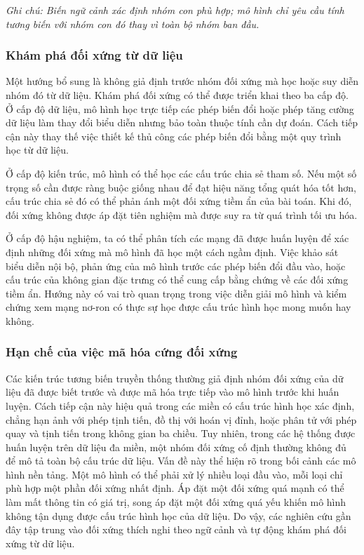 \noindent\textit{Ghi chú: Biến ngữ cảnh xác định nhóm con phù hợp; mô hình chỉ yêu cầu tính tương biến với nhóm con đó thay vì toàn bộ nhóm ban đầu.}

\subsubsection{Khám phá đối xứng từ dữ liệu}

Một hướng bổ sung là không giả định trước nhóm đối xứng mà học hoặc suy diễn nhóm đó từ dữ liệu. Khám phá đối xứng có thể được triển khai theo ba cấp độ. Ở cấp độ dữ liệu, mô hình học trực tiếp các phép biến đổi hoặc phép tăng cường dữ liệu làm thay đổi biểu diễn nhưng bảo toàn thuộc tính cần dự đoán. Cách tiếp cận này thay thế việc thiết kế thủ công các phép biến đổi bằng một quy trình học từ dữ liệu.

Ở cấp độ kiến trúc, mô hình có thể học các cấu trúc chia sẻ tham số. Nếu một số trọng số cần được ràng buộc giống nhau để đạt hiệu năng tổng quát hóa tốt hơn, cấu trúc chia sẻ đó có thể phản ánh một đối xứng tiềm ẩn của bài toán. Khi đó, đối xứng không được áp đặt tiên nghiệm mà được suy ra từ quá trình tối ưu hóa.

Ở cấp độ hậu nghiệm, ta có thể phân tích các mạng đã được huấn luyện để xác định những đối xứng mà mô hình đã học một cách ngầm định. Việc khảo sát biểu diễn nội bộ, phản ứng của mô hình trước các phép biến đổi đầu vào, hoặc cấu trúc của không gian đặc trưng có thể cung cấp bằng chứng về các đối xứng tiềm ẩn. Hướng này có vai trò quan trọng trong việc diễn giải mô hình và kiểm chứng xem mạng nơ-ron có thực sự học được cấu trúc hình học mong muốn hay không.

\label{subsec:flexible-symmetries}
\subsubsection{Hạn chế của việc mã hóa cứng đối xứng}
Các kiến trúc tương biến truyền thống thường giả định nhóm đối xứng của dữ liệu đã được biết trước và được mã hóa trực tiếp vào mô hình trước khi huấn luyện. Cách tiếp cận này hiệu quả trong các miền có cấu trúc hình học xác định, chẳng hạn ảnh với phép tịnh tiến, đồ thị với hoán vị đỉnh, hoặc phân tử với phép quay và tịnh tiến trong không gian ba chiều. Tuy nhiên, trong các hệ thống được huấn luyện trên dữ liệu đa miền, một nhóm đối xứng cố định thường không đủ để mô tả toàn bộ cấu trúc dữ liệu.
Vấn đề này thể hiện rõ trong bối cảnh các mô hình nền tảng. Một mô hình có thể phải xử lý nhiều loại đầu vào, mỗi loại chỉ phù hợp một phần đối xứng nhất định. Áp đặt một đối xứng quá mạnh có thể làm mất thông tin có giá trị, song áp đặt một đối xứng quá yếu khiến mô hình không tận dụng được cấu trúc hình học của dữ liệu. Do vậy, các nghiên cứu gần đây tập trung vào đối xứng thích nghi theo ngữ cảnh và tự động khám phá đối xứng từ dữ liệu.
